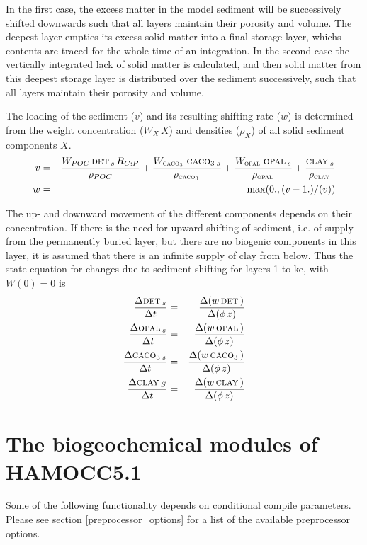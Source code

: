 \documentclass[11pt,a4paper,fleqn,twoside]{article}
\def\det{\text{\textsc{det}}\,}
\def\opal{\text{\textsc{opal}}\,}
\def\cal{\text{\textsc{caco$_3$}}\,}
\def\clay{\text{\textsc{clay}}\,}
\newcommand{\ham}{HAMOCC5.1\,}
\begin{document}
In the first case, the excess matter in the model sediment will be successively shifted downwards such
that all layers maintain their porosity and volume. 
The deepest layer empties its excess solid matter into a final
storage layer, whichs contents are traced for the whole time of an integration.
In the second case the vertically integrated lack of solid matter is
calculated, and then solid matter from this deepest storage layer is distributed
over the sediment successively, such that  all layers maintain their porosity
and volume.

The loading of the sediment ($v$) and its resulting shifting rate ($w$) is
determined from the weight concentration ($W_X\, X$) and densities ($\rho_X$)
of all solid sediment components $X$. 
\begin{eqnarray}
v & = & \frac{W_{POC}\,\det_s\,R_{C:P}}{\rho_{POC}}
+\frac{W_{\cal}\,\cal_s}{\rho_{\cal}}+\frac{W_{\opal}\,\opal_s}{\rho_{\opal}}
+\frac{\clay_s}{\rho_{\clay}}\\
w & = & \max(0.,(v-1.)/(v))
\end{eqnarray}


The up- and downward movement of the different components depends on their
concentration. If there is the need for upward shifting of sediment, i.e. of
supply from the permanently buried layer, but there are no biogenic components in this
layer, it is assumed that there is an infinite supply of clay from below. Thus
the state equation for changes due to sediment shifting  for layers 1 to ke,
with $W(0) = 0$  is
\begin{eqnarray}
\frac{\Delta \det_s}{\Delta t} & = &  \frac{\Delta (w \, \det)}{\Delta (\phi\,z)}\\
\frac{\Delta \opal_s}{\Delta t} & = & \frac{\Delta (w \, \opal)}{\Delta (\phi\,z)}\\
\frac{\Delta \cal_s}{\Delta t} & = & \frac{\Delta (w \, \cal)}{\Delta (\phi\,z)}\\
\frac{\Delta \clay_S}{\Delta t} & = & \frac{\Delta (w \, \clay)}{\Delta (\phi\,z)}
\end{eqnarray}

\clearpage
\newpage
\section{\label{sources}The biogeochemical modules of \ham}

Some of the following functionality depends on conditional compile parameters.
Please see section \ref{preprocessor_options} for a list of the available preprocessor options.
\end{document}
